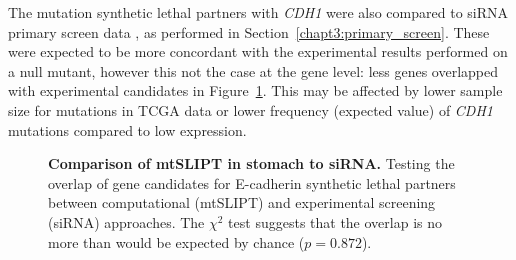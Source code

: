 The mutation synthetic lethal partners with \textit{CDH1} were also compared to \gls{siRNA} primary screen data \citep{Telford2015}, as performed in Section~\ref{chapt3:primary_screen}. These were expected to be more concordant with the experimental results performed on a null mutant, however this not the case at the gene level: less genes overlapped with experimental candidates in Figure~\ref{fig:Venn_allgenes_stad_mtSL}. This may be affected by lower sample size for mutations in \gls{TCGA} data or lower frequency (expected value) of \textit{CDH1} mutations compared to low expression. 

\begin{figure}[!ht]
  \centering
    \caption[Comparison of \acrshort{mtSLIPT} in stomach to \gls{siRNA}]{\small \textbf{Comparison of \acrshort{mtSLIPT} in stomach to \gls{siRNA}.} Testing the overlap of gene candidates for \gls{E-cadherin} synthetic lethal partners between computational (\acrshort{mtSLIPT}) and experimental screening (siRNA) approaches. The $\chi^2$ test suggests that the overlap is no more than would be expected by chance ($p = 0.872$). %
}
\label{fig:Venn_allgenes_stad_mtSL}
\end{figure}


